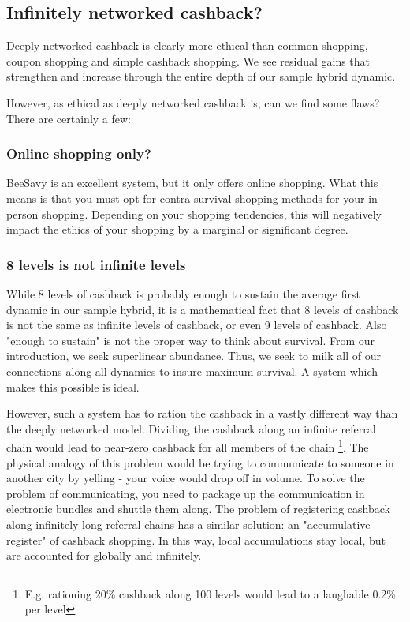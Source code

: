 \documentclass{article}%
\begin{document}
\subsection{Infinitely networked cashback?}

Deeply networked cashback is clearly more ethical than common shopping, coupon shopping and simple cashback shopping. We see residual gains that strengthen and increase through the entire depth of our sample hybrid dynamic.

However, as ethical as deeply networked cashback is, can we find some flaws? There are certainly a few:

\subsubsection{Online shopping only?}
BeeSavy is an excellent system, but it only offers online shopping. What this means is that you must opt for contra-survival shopping methods for your in-person shopping. Depending on your shopping tendencies, this will negatively impact the ethics of your shopping by a marginal or significant degree.

\subsubsection{8 levels is not infinite levels}
While 8 levels of cashback is probably enough to sustain the average first dynamic in our sample hybrid, it is a mathematical fact that 8 levels of cashback is not the same as infinite levels of cashback, or even 9 levels of cashback. Also "enough to sustain" is not the proper way to think about survival. From our introduction, we seek superlinear abundance. Thus, we seek to milk all of our connections along all dynamics to insure maximum survival. A system which makes this possible is ideal.

However, such a system has to ration the cashback in a vastly different way than the deeply networked model. Dividing the cashback along an infinite referral chain would lead to near-zero cashback for all members of the chain \footnote{E.g. rationing 20\% cashback along 100 levels would lead to a laughable 0.2\% per level}. The physical analogy of this problem would be trying to communicate to someone in another city by yelling - your voice would drop off in volume. To solve the problem of communicating, you need to package up the communication in electronic bundles and shuttle them along. The problem of registering cashback along infinitely long referral chains has a similar solution: an "accumulative register" of cashback shopping. In this way, local accumulations stay local, but are accounted for globally and infinitely.
\end{document}
